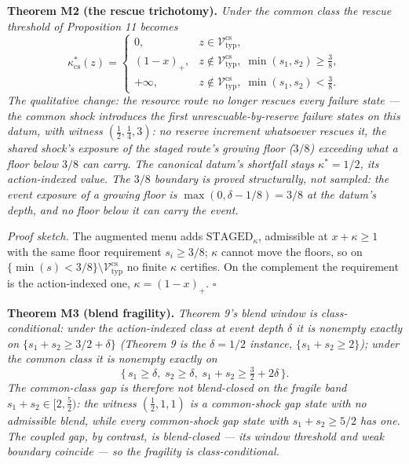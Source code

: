 \documentclass[3p,11pt]{elsarticle}
\begin{document}
\textbf{Theorem M2 (the rescue trichotomy).} \emph{Under the common
class the rescue threshold of Proposition 11 becomes}
\[
\kappa^*_{\mathrm{cs}}(z) =
\begin{cases}
0, & z \in \mathcal{V}_{\mathrm{typ}}^{\mathrm{cs}}, \\[2pt]
(1 - x)_+, & z \notin \mathcal{V}_{\mathrm{typ}}^{\mathrm{cs}},\;
\min(s_1, s_2) \ge \tfrac38, \\[2pt]
+\infty, & z \notin \mathcal{V}_{\mathrm{typ}}^{\mathrm{cs}},\;
\min(s_1, s_2) < \tfrac38.
\end{cases}
\]
\emph{The qualitative change: the resource route no longer rescues every
failure state --- the common shock introduces the first
unrescuable-by-reserve failure states on this datum, with witness
\((\tfrac12, \tfrac14, 3)\): no reserve increment whatsoever rescues
it, the shared shock's exposure of the staged route's growing floor
(\(3/8\)) exceeding what a floor below \(3/8\) can carry. The
canonical datum's shortfall stays \(\kappa^* = 1/2\), its
action-indexed value. The \(3/8\) boundary is proved structurally, not
sampled: the event exposure of a growing floor is \(\max(0, \delta -
1/8) = 3/8\) at the datum's depth, and no floor below it can carry the
event.}

\emph{Proof sketch.} The augmented menu adds
\(\mathrm{STAGED}_\kappa\), admissible at \(x + \kappa \ge 1\)
with the same floor requirement \(s_i \ge 3/8\); \(\kappa\) cannot
move the floors, so on \(\{\min(s) < 3/8\} \setminus
\mathcal{V}_{\mathrm{typ}}^{\mathrm{cs}}\) no finite \(\kappa\)
certifies. On the complement the requirement is the action-indexed one,
\(\kappa = (1 - x)_+\). \ensuremath{\square}

\textbf{Theorem M3 (blend fragility).} \emph{Theorem 9's blend window is
class-conditional: under the action-indexed class at event depth
\(\delta\) it is nonempty exactly on \(\{ s_1 + s_2 \ge 3/2 +
\delta \}\) (Theorem 9 is the \(\delta = 1/2\) instance, \(\{
s_1 + s_2 \ge 2 \}\)); under the common class it is nonempty exactly
on}
\[
\{\, s_1 \ge \delta,\; s_2 \ge \delta,\; s_1 + s_2 \ge \tfrac32 +
2\delta \,\}.
\]
\emph{The common-class gap is therefore not blend-closed on the fragile
band \(s_1 + s_2 \in [2, \tfrac52)\): the witness \((\tfrac12, 1,
1)\) is a common-shock gap state with no admissible blend, while every
common-shock gap state with \(s_1 + s_2 \ge 5/2\) has one. The
coupled gap, by contrast, is blend-closed --- its window threshold and
weak boundary coincide --- so the fragility is class-conditional.}
\end{document}
